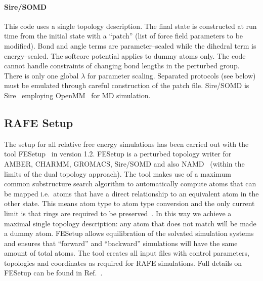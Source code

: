 \documentclass[journal=jctcce,manuscript=article]{achemso}
\begin{document}
\paragraph{Sire/SOMD} This code uses a single topology description.
The final state is constructed at run time from the initial state with
a ``patch'' (list of force field parameters to be modified).  Bond and
angle terms are parameter--scaled while the dihedral term is
energy--scaled.  The softcore potential applies to dummy atoms only.
The code cannot handle constraints of changing bond lengths in the
perturbed group.  There is only one global $\lambda$ for parameter
scaling.  Separated protocols (see below) must be emulated through
careful construction of the patch file.  Sire/SOMD is
Sire~\cite{Sire-2016} employing OpenMM~\cite{doi:10.1021/ct300857j}
for MD simulation.


\subsection{RAFE Setup}
\label{sec:rafe_setup}

The setup for all relative free energy simulations has been carried
out with the tool FESetup~\cite{loeffler_fesetup:_2015} in version
1.2.  FESetup is a perturbed topology writer for AMBER, CHARMM,
GROMACS, Sire/SOMD and also NAMD~\cite{JCC:JCC20289} (within the
limits of the dual topology approach).  The tool makes use of a
maximum common substructure search algorithm to automatically compute
atoms that can be mapped i.e.\ atoms that have a direct relationship
to an equivalent atom in the other state.  This means atom type to
atom type conversion and the only current limit is that rings are
required to be preserved~\cite{doi:10.1021/acs.jcim.5b00057}.  In this
way we achieve a maximal single topology description: any atom that
does not match will be made a dummy atom.  FESetup allows
equilibration of the solvated simulation systems and ensures that
``forward'' and ``backward'' simulations will have the same amount of
total atoms.  The tool creates all input files with control
parameters, topologies and coordinates as required for RAFE
simulations.  Full details on FESetup can be found in
Ref.~.
\end{document}
